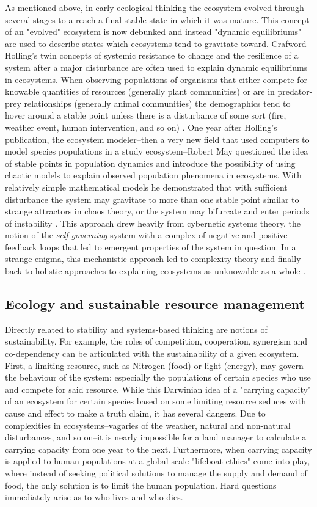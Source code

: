 As mentioned above, in early ecological thinking the ecosystem evolved through several stages to a reach a final stable state in which it was mature. This concept of an "evolved" ecosystem is now debunked and instead "dynamic equilibriums" are used to describe states which ecosystems tend to gravitate toward. Crafword Holling's twin concepts of systemic resistance to change and the resilience of a system after a major disturbance are often used to explain dynamic equilibriums in ecosystems. When observing populations of organisms that either compete for knowable quantities of resources (generally plant communities) or are in predator-prey relationships (generally animal communities) the demographics tend to hover around a stable point unless there is a disturbance of some sort (fire, weather event, human intervention, and so on) \citep{holling_1973}. One year after Holling's publication, the ecosystem modeler--then a very new field that used computers to model species populations in a study ecosystem--Robert May questioned the idea of stable points in population dynamics and introduce the possibility of using chaotic models to explain observed population phenomena in ecosystems. With relatively simple mathematical models he demonstrated that with sufficient disturbance the system may gravitate to more than one stable point similar to strange attractors in chaos theory, or the system may bifurcate and enter periods of instability \citep{may_1974}. This approach drew heavily from cybernetic systems theory, the notion of the \textit{self-governing} system with a complex of negative and positive feedback loops that led to emergent properties of the system in question. In a strange enigma, this mechanistic approach led to complexity theory and finally back to holistic approaches to explaining ecosystems as unknowable as a whole \citep{barbour_1996}.

\subsection{Ecology and sustainable resource management}

Directly related to stability and systems-based thinking are notions of sustainability. For example, the roles of competition, cooperation, synergism and co-dependency can be articulated with the sustainability of a given ecosystem. First, a limiting resource, such as Nitrogen (food) or light (energy), may govern the behaviour of the system; especially the populations of certain species who use and compete for said resource. While this Darwinian idea of a "carrying capacity" of an ecosystem for certain species based on some limiting resource seduces with cause and effect to make a truth claim, it has several dangers. Due to complexities in ecosystems--vagaries of the weather, natural and non-natural disturbances, and so on--it is nearly impossible for a land manager to calculate a carrying capacity from one year to the next. Furthermore, when carrying capacity is applied to human populations at a global scale "lifeboat ethics" come into play, where instead of seeking political solutions to manage the supply and demand of food, the only solution is to limit the human population. Hard questions immediately arise as to who lives and who dies.

